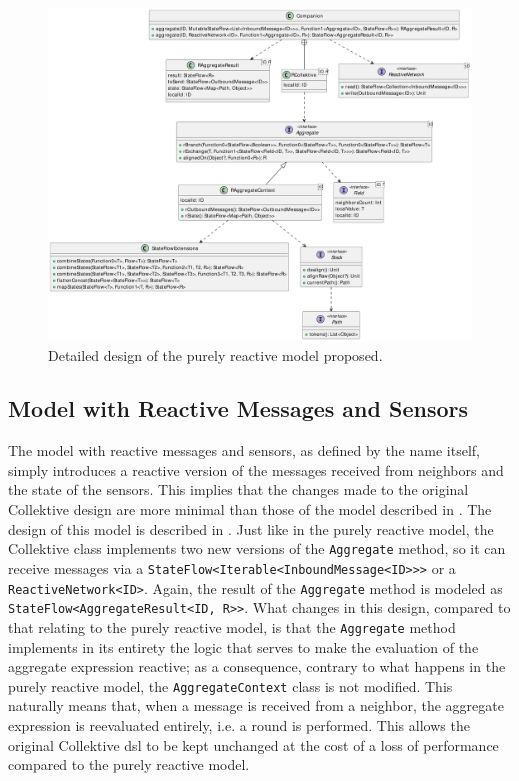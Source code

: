 \begin{figure}
    \centering
    \includegraphics[width=\linewidth]{figures/collektive-prm-design.pdf}
    \caption{Detailed design of the purely reactive model proposed.}
    \label{fig:collektive-prm-design}
\end{figure}

\subsection{Model with Reactive Messages and Sensors}

The model with reactive messages and sensors, as defined by the name itself, simply introduces a reactive version of the messages received from neighbors and the state of the sensors. This implies that the changes made to the original Collektive design are more minimal than those of the model described in . The design of this model is described in . Just like in the purely reactive model, the Collektive class implements two new versions of the \texttt{Aggregate} method, so it can receive messages via a \texttt{StateFlow<Iterable<InboundMessage<ID>>>} or a \texttt{ReactiveNetwork<ID>}. Again, the result of the \texttt{Aggregate} method is modeled as \texttt{StateFlow<AggregateResult<ID, R>>}. What changes in this design, compared to that relating to the purely reactive model, is that the \texttt{Aggregate} method implements in its entirety the logic that serves to make the evaluation of the aggregate expression reactive; as a consequence, contrary to what happens in the purely reactive model, the \texttt{AggregateContext} class is not modified. This naturally means that, when a message is received from a neighbor, the aggregate expression is reevaluated entirely, i.e. a round is performed. This allows the original Collektive \ac{dsl} to be kept unchanged at the cost of a loss of performance compared to the purely reactive model.

